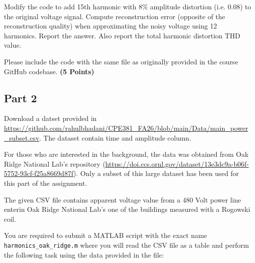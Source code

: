 \documentclass[12pt, xcolor=dvipsnames,svgnames,x11names]{article}
\begin{document}
Modify the code to add 15th harmonic with 8\% amplitude distortion (i.e. 0.08) to the original voltage signal. Compute reconstruction error (opposite of the reconstruction quality) when approximating the noisy voltage using 12 harmonics. Report the answer. Also report the total harmonic distortion THD value.

Please include the code with the same file as originally provided in the course GitHub codebase. \hfill \textbf{(5 Points)}

\subsection{Part 2}

Download a datset provided in \url{https://github.com/rahulbhadani/CPE381_FA26/blob/main/Data/main_power_subset.csv}. The dataset contain time and amplitude column. 

For those who are interested in the background, the data was obtained from Oak Ridge National Lab's repository (\url{https://doi.ccs.ornl.gov/dataset/13e3dc9a-b06f-5752-93cf-f25a8669d87f}). Only a subset of this large dataset has been used for this part of the assignment. 

The given CSV file contains apparent voltage value from a 480 Volt power line enterin Oak Ridge National Lab's one of the buildings measured with a Rogowski coil.


You are required to submit a MATLAB script with the exact name \texttt{harmonics\_oak\_ridge.m} where you will read the CSV file as a table and perform the following task using the data provided in the file:
\end{document}
